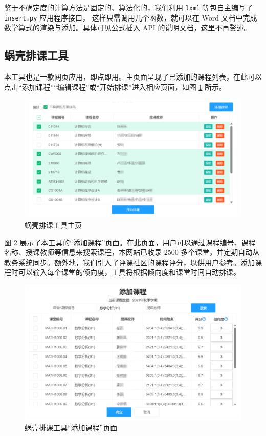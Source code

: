 鉴于不确定度的计算方法是固定的、算法化的，我们利用 \verb|lxml| 等包自主编写了 \verb|insert.py| 应用程序接口，
这样只需调用几个函数，就可以在 Word 文档中完成数学算式的渲染与添加。具体可见公式插入 API 的说明文档，这里不再赘述。

\subsection{蜗壳排课工具}

本工具也是一款网页应用，即点即用。主页面呈现了已添加的课程列表，在此可以点击“添加课程”“编辑课程”或“开始排课”进入相应页面，如图 \ref{fig:p1} 所示。

\begin{figure}[htbp]
  \centering
  \includegraphics[width=\columnwidth]{figure/p1.png}
  \caption{蜗壳排课工具主页}
  \label{fig:p1}
\end{figure}

图 \ref{fig:p2} 展示了本工具的“添加课程”页面。在此页面，用户可以通过课程编号、课程名称、授课教师等信息来搜索课程，本网站已收录 2500 多个课堂，并定期自动从教务系统同步。额外地，我们引入了评课社区的课程评分，以供用户参考。添加课程时可以输入每个课堂的倾向度，工具将根据倾向度和课堂时间自动排课。

\begin{figure}[htbp]
  \centering
  \includegraphics[width=\columnwidth]{figure/p2.png}
  \caption{蜗壳排课工具“添加课程”页面}
  \label{fig:p2}
\end{figure}

